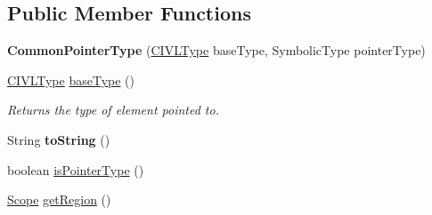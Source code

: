 \subsection*{Public Member Functions}
\begin{DoxyCompactItemize}
\item 
\hypertarget{classedu_1_1udel_1_1cis_1_1vsl_1_1civl_1_1model_1_1common_1_1type_1_1CommonPointerType_a1f93e38c9ce04f4f556ffafa770a6730}{}{\bfseries Common\+Pointer\+Type} (\hyperlink{interfaceedu_1_1udel_1_1cis_1_1vsl_1_1civl_1_1model_1_1IF_1_1type_1_1CIVLType}{C\+I\+V\+L\+Type} base\+Type, Symbolic\+Type pointer\+Type)\label{classedu_1_1udel_1_1cis_1_1vsl_1_1civl_1_1model_1_1common_1_1type_1_1CommonPointerType_a1f93e38c9ce04f4f556ffafa770a6730}

\item 
\hyperlink{interfaceedu_1_1udel_1_1cis_1_1vsl_1_1civl_1_1model_1_1IF_1_1type_1_1CIVLType}{C\+I\+V\+L\+Type} \hyperlink{classedu_1_1udel_1_1cis_1_1vsl_1_1civl_1_1model_1_1common_1_1type_1_1CommonPointerType_aa8a138a6c6f93a2506fac83b6beabc10}{base\+Type} ()
\begin{DoxyCompactList}\small\item\em Returns the type of element pointed to. \end{DoxyCompactList}\item 
\hypertarget{classedu_1_1udel_1_1cis_1_1vsl_1_1civl_1_1model_1_1common_1_1type_1_1CommonPointerType_af8b5fe9988a38b3ee410c2985e74f572}{}String {\bfseries to\+String} ()\label{classedu_1_1udel_1_1cis_1_1vsl_1_1civl_1_1model_1_1common_1_1type_1_1CommonPointerType_af8b5fe9988a38b3ee410c2985e74f572}

\item 
boolean \hyperlink{classedu_1_1udel_1_1cis_1_1vsl_1_1civl_1_1model_1_1common_1_1type_1_1CommonPointerType_ab49813d51a2bc4f067fa3c9944937dbb}{is\+Pointer\+Type} ()
\item 
\hypertarget{classedu_1_1udel_1_1cis_1_1vsl_1_1civl_1_1model_1_1common_1_1type_1_1CommonPointerType_a788028524d642fa1467b040d2b5c65a2}{}\hyperlink{interfaceedu_1_1udel_1_1cis_1_1vsl_1_1civl_1_1model_1_1IF_1_1Scope}{Scope} \hyperlink{classedu_1_1udel_1_1cis_1_1vsl_1_1civl_1_1model_1_1common_1_1type_1_1CommonPointerType_a788028524d642fa1467b040d2b5c65a2}{get\+Region} ()\label{classedu_1_1udel_1_1cis_1_1vsl_1_1civl_1_1model_1_1common_1_1type_1_1CommonPointerType_a788028524d642fa1467b040d2b5c65a2}


\end{DoxyCompactItemize}
